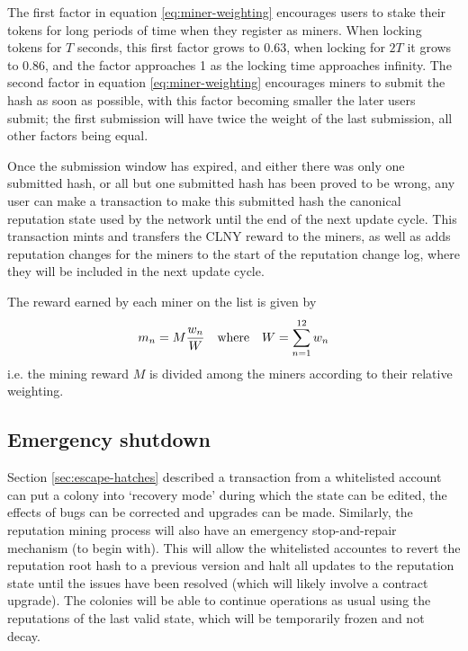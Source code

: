 The first factor in equation \eqref{eq:miner-weighting} encourages users to stake their tokens for long periods of time when they register as miners. When locking tokens for $T$ seconds, this first factor grows to 0.63, when locking for $2T$ it grows to 0.86, and the factor approaches 1 as the locking time approaches infinity. The second factor in equation \eqref{eq:miner-weighting} encourages miners to submit the hash as soon as possible, with this factor becoming smaller the later users submit; the first submission will have twice the weight of the last submission, all other factors being equal.

Once the submission window has expired, and either there was only one submitted hash, or all but one submitted hash has been proved to be wrong, any user can make a transaction to make this submitted hash the canonical reputation state used by the network until the end of the next update cycle. This transaction mints and transfers the CLNY reward to the miners, as well as adds reputation changes for the miners to the start of the reputation change log, where they will be included in the next update cycle.

The reward earned by each miner on the list is given by
\begin{equation}\label{eq:miner-payout}
 m_n = M \frac{w_n}{W} \quad \textnormal{where} \quad W = \sum_{n=1}^{12} w_n
\end{equation}
i.e. the mining reward $M$ is divided among the miners according to their relative weighting.

\subsection{Emergency shutdown}\label{sec:big-red-button}

Section \ref{sec:escape-hatches} described a transaction from a whitelisted account can put a colony into `recovery mode' during which the state can be edited, the effects of bugs can be corrected and upgrades can be made. Similarly, the reputation mining process will also have an emergency stop-and-repair mechanism (to begin with). This will allow the whitelisted accountes to revert the reputation root hash to a previous version and halt all updates to the reputation state until the issues have been resolved (which will likely involve a contract upgrade). The colonies will be able to continue operations as usual using the reputations of the last valid state, which will be temporarily frozen and not decay.
